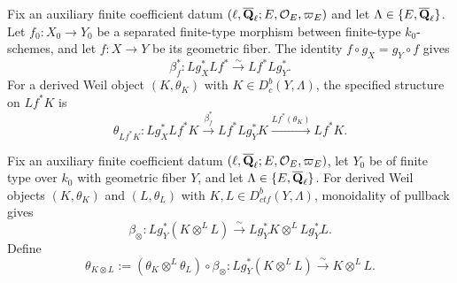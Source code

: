 
\begin{definition}
\label{def:weil-pullback-object}


Fix an auxiliary finite coefficient datum
\((\ell,\overline{\mathbf Q}_\ell;E,\mathcal O_E,\varpi_E)\) and let
\(\Lambda\in\{E,\overline{\mathbf Q}_\ell\}\).  Let \(f_0:X_0\to Y_0\) be a separated
finite-type morphism between finite-type \(k_0\)-schemes, and let
\(f:X\to Y\) be its geometric fiber.  The identity
\(f\circ g_X=g_Y\circ f\) gives
\[
 \beta_{f}^{*}:Lg_X^*Lf^*\xrightarrow{\sim}Lf^*Lg_Y^*.
\]
For a derived Weil object \((K,\theta_K)\) with
\(K\in D^b_c(Y,\Lambda)\), the specified structure on \(Lf^*K\) is
\[
 \theta_{Lf^*K}:Lg_X^*Lf^*K
 \xrightarrow{\beta_f^*}Lf^*Lg_Y^*K
 \xrightarrow{Lf^*(\theta_K)}Lf^*K.
\]
\end{definition}


\begin{definition}
\label{def:weil-tensor-object}


Fix an auxiliary finite coefficient datum
\((\ell,\overline{\mathbf Q}_\ell;E,\mathcal O_E,\varpi_E)\), let \(Y_0\) be of finite type
over \(k_0\) with geometric fiber \(Y\), and let
\(\Lambda\in\{E,\overline{\mathbf Q}_\ell\}\).  For derived Weil objects
\((K,\theta_K)\) and \((L,\theta_L)\) with
\(K,L\in D^b_{ctf}(Y,\Lambda)\),
monoidality of pullback gives
\[
 \beta_{\otimes}:Lg_Y^*(K\otimes^L L)
 \xrightarrow{\sim}Lg_Y^*K\otimes^LLg_Y^*L.
\]
Define
\[
 \theta_{K\otimes L}:=
 (\theta_K\otimes^L\theta_L)\circ\beta_{\otimes}:
 Lg_Y^*(K\otimes^LL)\xrightarrow{\sim}K\otimes^LL.
\]
\end{definition}

